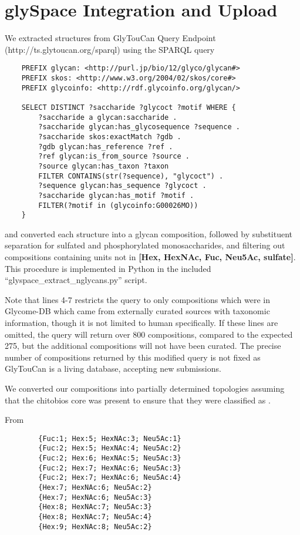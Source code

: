 
\section{glySpace Integration and Upload}\label{sec:glyspace_integration_and_upload}

    We extracted \nglycan structures from GlyTouCan Query Endpoint (http://ts.glytoucan.org/sparql) using the SPARQL query

    \begin{verbatim}
    PREFIX glycan: <http://purl.jp/bio/12/glyco/glycan#>
    PREFIX skos: <http://www.w3.org/2004/02/skos/core#>
    PREFIX glycoinfo: <http://rdf.glycoinfo.org/glycan/>

    SELECT DISTINCT ?saccharide ?glycoct ?motif WHERE {
        ?saccharide a glycan:saccharide .
        ?saccharide glycan:has_glycosequence ?sequence .
        ?saccharide skos:exactMatch ?gdb .
        ?gdb glycan:has_reference ?ref .
        ?ref glycan:is_from_source ?source .
        ?source glycan:has_taxon ?taxon
        FILTER CONTAINS(str(?sequence), "glycoct") .
        ?sequence glycan:has_sequence ?glycoct .
        ?saccharide glycan:has_motif ?motif .
        FILTER(?motif in (glycoinfo:G00026MO))
    }
    \end{verbatim} and converted each structure into a glycan composition, followed
    by substituent separation for sulfated and phosphorylated monosaccharides, and
    filtering out compositions containing units not in \textbf{[Hex, HexNAc, Fuc, Neu5Ac, sulfate]}.
    This procedure is implemented in Python in the included ``glyspace\_extract\_nglycans.py'' script.

    Note that lines 4-7 restricts the query to only compositions which were in Glycome-DB which came
    from externally curated sources with taxonomic information, though it is not limited to human \nglycans
    specifically. If these lines are omitted, the query will return over 800 compositions, compared to
    the expected 275, but the additional compositions will not have been curated. The precise number of
    compositions returned by this modified query is not fixed as GlyTouCan is a living database, accepting new
    submissions.

    We converted our \nglycan compositions into partially determined topologies
    assuming that the chitobios core was present to ensure that they were classified
    as \nglycans.

    From \rpserum
    \begin{verbatim}
        {Fuc:1; Hex:5; HexNAc:3; Neu5Ac:1}
        {Fuc:2; Hex:5; HexNAc:4; Neu5Ac:2}
        {Fuc:2; Hex:6; HexNAc:5; Neu5Ac:3}
        {Fuc:2; Hex:7; HexNAc:6; Neu5Ac:3}
        {Fuc:2; Hex:7; HexNAc:6; Neu5Ac:4}
        {Hex:7; HexNAc:6; Neu5Ac:2}
        {Hex:7; HexNAc:6; Neu5Ac:3}
        {Hex:8; HexNAc:7; Neu5Ac:3}
        {Hex:8; HexNAc:7; Neu5Ac:4}
        {Hex:9; HexNAc:8; Neu5Ac:2}
    \end{verbatim}

